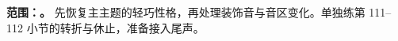 \textbf{范围：\CurrentSegmentRange。} 先恢复主主题的轻巧性格，再处理装饰音与音区变化。单独练第 111--112 小节的转折与休止，准备接入尾声。
\SegmentScore
